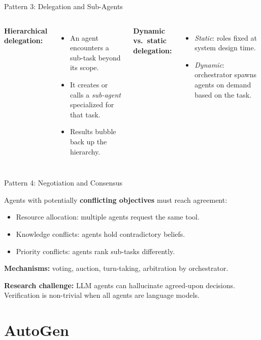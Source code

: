 \documentclass[aspectratio=169,10pt]{beamer}
\begin{document}
\begin{frame}{Pattern 3: Delegation and Sub-Agents}
  \begin{columns}[T]
      \textbf{Hierarchical delegation:}
      \begin{itemize}
        \item An agent encounters a sub-task beyond its scope.
        \item It creates or calls a \emph{sub-agent} specialized for that task.
        \item Results bubble back up the hierarchy.
      \end{itemize}
      \vspace{0.4em}
      \textbf{Dynamic vs.\ static delegation:}
      \begin{itemize}
        \item \emph{Static}: roles fixed at system design time.
        \item \emph{Dynamic}: orchestrator spawns agents on demand based on the task.
      \end{itemize}
  \end{columns}
\end{frame}

\begin{frame}{Pattern 4: Negotiation and Consensus}
  \begin{tcolorbox}[hitbox]
    Agents with potentially \textbf{conflicting objectives} must reach agreement:
    \begin{itemize}
      \item Resource allocation: multiple agents request the same tool.
      \item Knowledge conflicts: agents hold contradictory beliefs.
      \item Priority conflicts: agents rank sub-tasks differently.
    \end{itemize}
    \textbf{Mechanisms:} voting, auction, turn-taking, arbitration by orchestrator.
  \end{tcolorbox}
  \vspace{0.4em}
  \textbf{Research challenge:} LLM agents can hallucinate agreed-upon decisions.
  Verification is non-trivial when all agents are language models.
\end{frame}

\section{AutoGen}
\end{document}
